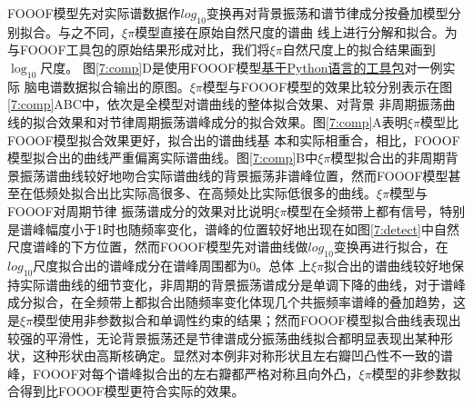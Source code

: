 FOOOF模型先对实际谱数据作$log_{10}$变换再对背景振荡和谱节律成分按叠加模型分别拟合。与之不同，$\xi\pi$模型直接在原始自然尺度的谱曲
线上进行分解和拟合。为与FOOOF工具包的原始结果形成对比，我们将$\xi\pi$自然尺度上的拟合结果画到$\log_{10}$尺度。
图\ref{7:comp}D是使用FOOOF模型\href{https://github.com/fooof-tools/fooof/tree/master/fooof}{基于Python语言的工具包}对一例实际
脑电谱数据拟合输出的原图。$\xi\pi$模型与FOOOF模型的效果比较分别表示在图\ref{7:comp}ABC中，依次是全模型对谱曲线的整体拟合效果、对背景
非周期振荡曲线的拟合效果和对节律周期振荡谱峰成分的拟合效果。图\ref{7:comp}A表明$\xi\pi$模型比FOOOF模型拟合效果更好，拟合出的谱曲线基
本和实际相重合，相比，FOOOF模型拟合出的曲线严重偏离实际谱曲线。图\ref{7:comp}B中$\xi\pi$模型拟合出的非周期背景振荡谱曲线较好地吻合实际谱曲线的背景振荡非谱峰位置，然而FOOOF模型甚至在低频处拟合出比实际高很多、在高频处比实际低很多的曲线。$\xi\pi$模型与FOOOF对周期节律
振荡谱成分的效果对比说明$\xi\pi$模型在全频带上都有信号，特别是谱峰幅度小于1时也随频率变化，谱峰的位置较好地出现在如图\ref{7:detect}中自然尺度谱峰的下方位置，然而FOOOF模型先对谱曲线做$log_{10}$变换再进行拟合，在$log_{10}$尺度拟合出的谱峰成分在谱峰周围都为0。总体
上$\xi\pi$拟合出的谱曲线较好地保持实际谱曲线的细节变化，非周期的背景振荡谱成分是单调下降的曲线，对于谱峰成分拟合，在全频带上都拟合出随频率变化体现几个共振频率谱峰的叠加趋势，这是$\xi\pi$模型使用非参数拟合和单调性约束的结果；然而FOOOF模型拟合曲线表现出较强的平滑性，无论背景振荡还是节律谱成分振荡曲线拟合都明显表现出某种形状，这种形状由高斯核确定。显然对本例非对称形状且左右瓣凹凸性不一致的谱峰，FOOOF对每个谱峰拟合出的左右瓣都严格对称且向外凸，$\xi\pi$模型的非参数拟合得到比FOOOF模型更符合实际的效果。

